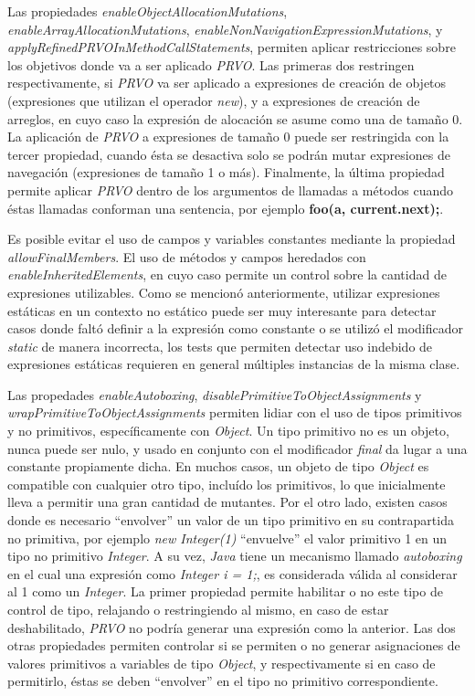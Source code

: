 Las propiedades \emph{enableObjectAllocationMutations}, \emph{enableArrayAllocationMutations}, \emph{enableNonNavigationExpressionMutations}, y \emph{applyRefinedPRVOInMethodCallStatements}, permiten aplicar restricciones sobre los objetivos donde va a ser aplicado \emph{PRVO}. Las primeras dos restringen respectivamente, si \emph{PRVO} va ser aplicado a expresiones de creaci\'on de objetos (expresiones que utilizan el operador \emph{new}), y a expresiones de creaci\'on de arreglos, en cuyo caso la expresi\'on de alocaci\'on se asume como una de tama\~no 0. La aplicaci\'on de \emph{PRVO} a expresiones de tama\~no 0 puede ser restringida con la tercer propiedad, cuando \'esta se desactiva solo se podr\'an mutar expresiones de navegaci\'on (expresiones de tama\~no 1 o m\'as). Finalmente, la \'ultima propiedad permite aplicar \emph{PRVO} dentro de los argumentos de llamadas a m\'etodos cuando \'estas llamadas conforman una sentencia, por ejemplo \textbf{foo(a, current.next);}.

Es posible evitar el uso de campos y variables constantes mediante la propiedad \emph{allowFinalMembers}. El uso de m\'etodos y campos heredados con \emph{enableInheritedElements}, en cuyo caso permite un control sobre la cantidad de expresiones utilizables. Como se mencion\'o anteriormente, utilizar expresiones est\'aticas en un contexto no est\'atico puede ser muy interesante para detectar casos donde falt\'o definir a la expresi\'on como constante o se utiliz\'o el modificador \emph{static} de manera incorrecta, los tests que permiten detectar uso indebido de expresiones est\'aticas requieren en general m\'ultiples instancias de la misma clase.

Las propedades \emph{enableAutoboxing}, \emph{disablePrimitiveToObjectAssignments} y \emph{wrapPrimitiveToObjectAssignments} permiten lidiar con el uso de tipos primitivos y no primitivos, espec\'ificamente con \emph{Object}. Un tipo primitivo no es un objeto, nunca puede ser nulo, y usado en conjunto con el modificador \emph{final} da lugar a una constante propiamente dicha. En muchos casos, un objeto de tipo \emph{Object} es compatible con cualquier otro tipo, inclu\'ido los primitivos, lo que inicialmente lleva a permitir una gran cantidad de mutantes. Por el otro lado, existen casos donde es necesario ``envolver'' un valor de un tipo primitivo en su contrapartida no primitiva, por ejemplo \emph{new Integer(1)} ``envuelve'' el valor primitivo 1 en un tipo no primitivo \emph{Integer}. A su vez, \emph{Java} tiene un mecanismo llamado \emph{autoboxing} en el cual una expresi\'on como \emph{Integer i = 1;}, es considerada v\'alida al considerar al 1 como un \emph{Integer}. La primer propiedad permite habilitar o no este tipo de control de tipo, relajando o restringiendo al mismo, en caso de estar deshabilitado, \emph{PRVO} no podr\'ia generar una expresi\'on como la anterior. Las dos otras propiedades permiten controlar si se permiten o no generar asignaciones de valores primitivos a variables de tipo \emph{Object}, y respectivamente si en caso de permitirlo, \'estas se deben ``envolver'' en el tipo no primitivo correspondiente.

